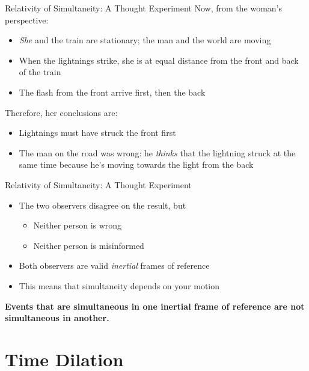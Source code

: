\documentclass[12pt,compress,aspectratio=169]{beamer}
\begin{document}
\begin{frame}{Relativity of Simultaneity: A Thought Experiment}
  Now, from the woman's perspective:
  \begin{itemize}
  \item\emph{She} and the train are stationary; the man and the world are moving
  \item When the lightnings strike, she is at equal distance from the front and
    back of the train
  \item The flash from the front arrive first, then the back
  \end{itemize}
  
  \vspace{.1in}Therefore, her conclusions are:
  \begin{itemize}
  \item Lightnings must have struck the front first
  \item The man on the road was wrong: he \emph{thinks} that
    the lightning struck at the same time because he's moving towards the light
    from the back
  \end{itemize}
\end{frame}



\begin{frame}{Relativity of Simultaneity: A Thought Experiment}
  \begin{itemize}
  \item The two observers disagree on the result, but
    \begin{itemize}
    \item Neither person is wrong
    \item Neither person is misinformed
    \end{itemize}
  \item Both observers are valid \emph{inertial} frames of reference
  \item This means that simultaneity depends on your motion
  \end{itemize}
  
  \vspace{.2in}\textbf{Events that are simultaneous in one inertial frame of
    reference are not simultaneous in another.}
\end{frame}



\section{Time Dilation}
\end{document}
